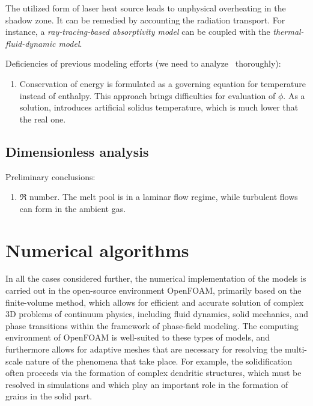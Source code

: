\documentclass{article}
\newcommand{\OpenFOAM}{OpenFOAM\textregistered\xspace}
\begin{document}
The utilized form of laser heat source leads to unphysical overheating in the shadow zone.
It can be remedied by accounting the radiation transport.
For instance, a \emph{ray‐tracing‐based absorptivity model} can be coupled with the \emph{thermal-fluid-dynamic model}.

Deficiencies of previous modeling efforts (we need to analyze~\cite{cook2019simulation} thoroughly):
\begin{enumerate}
    \item Conservation of energy is formulated as a governing equation for temperature instead of enthalpy.
    This approach brings difficulties for evaluation of $\phi$.
    As a solution, \citet{wang2019powder} introduces artificial solidus temperature,
    which is much lower that the real one.
\end{enumerate}

\subsection{Dimensionless analysis}

Preliminary conclusions:
\begin{enumerate}
    \item $\Re$ number. The melt pool is in a laminar flow regime, while  turbulent flows can form in the ambient gas.
\end{enumerate}

\section{Numerical algorithms}

In all the cases considered further, the numerical implementation of the models is carried out
in the open-source environment \OpenFOAM, primarily based on the finite-volume method,
which allows for efficient and accurate solution of complex 3D problems of continuum physics,
including fluid dynamics, solid mechanics, and phase transitions within the framework of phase-field modeling.
The computing environment of \OpenFOAM is well-suited to these types of models,
and furthermore allows for adaptive meshes that are necessary
for resolving the multi-scale nature of the phenomena that take place.
For example, the solidification often proceeds via the formation of complex dendritic structures,
which must be resolved in simulations and which play an important role in the formation of grains in the solid part.
\end{document}
